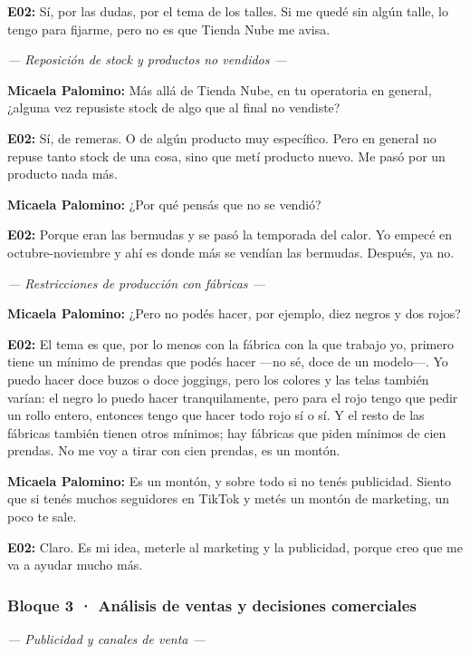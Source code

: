 \noindent\textbf{E02:} Sí, por las dudas, por el tema de los talles. Si me quedé sin algún talle, lo tengo para fijarme, pero no es que Tienda Nube me avisa.

\noindent\textit{--- Reposición de stock y productos no vendidos ---}

\noindent\textbf{Micaela Palomino:} Más allá de Tienda Nube, en tu operatoria en general, ¿alguna vez repusiste stock de algo que al final no vendiste?

\noindent\textbf{E02:} Sí, de remeras. O de algún producto muy específico. Pero en general no repuse tanto stock de una cosa, sino que metí producto nuevo. Me pasó por un producto nada más.

\noindent\textbf{Micaela Palomino:} ¿Por qué pensás que no se vendió?

\noindent\textbf{E02:} Porque eran las bermudas y se pasó la temporada del calor. Yo empecé en octubre-noviembre y ahí es donde más se vendían las bermudas. Después, ya no.

\noindent\textit{--- Restricciones de producción con fábricas ---}

\noindent\textbf{Micaela Palomino:} ¿Pero no podés hacer, por ejemplo, diez negros y dos rojos?

\noindent\textbf{E02:} El tema es que, por lo menos con la fábrica con la que trabajo yo, primero tiene un mínimo de prendas que podés hacer ---no sé, doce de un modelo---. Yo puedo hacer doce buzos o doce joggings, pero los colores y las telas también varían: el negro lo puedo hacer tranquilamente, pero para el rojo tengo que pedir un rollo entero, entonces tengo que hacer todo rojo sí o sí. Y el resto de las fábricas también tienen otros mínimos; hay fábricas que piden mínimos de cien prendas. No me voy a tirar con cien prendas, es un montón.

\noindent\textbf{Micaela Palomino:} Es un montón, y sobre todo si no tenés publicidad. Siento que si tenés muchos seguidores en TikTok y metés un montón de marketing, un poco te sale.

\noindent\textbf{E02:} Claro. Es mi idea, meterle al marketing y la publicidad, porque creo que me va a ayudar mucho más.

\subsubsection*{Bloque 3 · Análisis de ventas y decisiones comerciales}

\noindent\textit{--- Publicidad y canales de venta ---}

